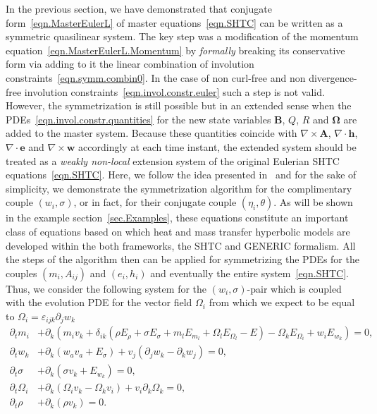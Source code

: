 \documentclass[twoside]{article}
\newcommand{\AAA}{{\boldsymbol{A}}}
\newcommand{\ww}{{\boldsymbol{w}}}
\newcommand{\ee}{{\boldsymbol{e}}}
\newcommand{\hh}{{\boldsymbol{h}}}
\newcommand{\BB}{{\boldsymbol{B}}}
\newcommand{\ted}{E} %
\newcommand{\pd}{\partial}
\begin{document}
In the previous section, we have demonstrated that conjugate 
form~\eqref{eqn.MasterEulerL} of master equations~\eqref{eqn.SHTC} can be 
written as a symmetric quasilinear system. The key 
step was a modification of the momentum 
equation~\eqref{eqn.MasterEulerL.Momentum} by \textit{formally} breaking its 
conservative 
form via adding to it the linear combination of involution 
constraints~\eqref{eqn.symm.combin0}. In the case of non curl-free and 
non divergence-free involution constraints~\eqref{eqn.invol.constr.euler} such 
a 
step is not valid. However, the symmetrization is still possible but in an 
extended sense when the PDEs~\eqref{eqn.invol.constr.quantities} for 
the new state variables $ \BB $, $ Q $, $ R $ and $ \bm{\Omega} $ are added to 
the 
master system. Because these quantities coincide with $ \nabla\times\AAA $, 
$ \nabla\cdot\hh $, $ \nabla\cdot\ee $ and $ \nabla\times\ww $ accordingly 
at each time instant, the extended system should be treated as a \textit{weakly 
non-local} extension system of the original Eulerian SHTC 
equations~\eqref{eqn.SHTC}. Here, we follow the idea presented 
in~\cite{Romenski2002} and for the sake of simplicity, we demonstrate the 
symmetrization 
algorithm 
for the 
complimentary couple $ (w_i,\sigma) $, or in fact, for their conjugate couple $ 
(\eta_i,\theta) $. As will be shown in 
the example section~\ref{sec.Examples}, these equations constitute an important 
class of equations based on which heat and mass transfer hyperbolic models are 
developed within the both frameworks, the SHTC and GENERIC formalism. All the 
steps of the algorithm then can be applied for 
symmetrizing the PDEs for the couples $ (m_i,A_{ij}) $ and $ (e_i,h_i) $ and 
eventually the entire system~\eqref{eqn.SHTC}.  Thus, we consider the 
following system for the $ 
(w_i,\sigma) $-pair which is coupled with the evolution PDE for the vector 
field $ \Omega_i $ from which we expect to be equal to $ \Omega_i = 
\varepsilon_{ijk}\pd_j w_k $
\begin{subequations}\label{eqn.symm.heat.E}
	\begin{align}
\pd_t m_i & + \pd _k \left (m_i v_k + \delta_{ik} \left( \rho \ted_\rho  + 
\sigma \ted_\sigma 	+ m_l\ted_{m_l} + \Omega_{l} \ted_{\Omega_l} - \ted 
\right) -  \Omega_{k} \ted_{\Omega_i} + w_i\ted_{w_k} \right ) = 0,\\[1mm]
\pd_t w_k & + \pd_k (w_a v_a + \ted_\sigma ) + v_j (\pd_j w_k - \pd_k w_j ) = 
0, \\[1mm]
\pd_t \sigma & +\pd _k(\sigma v_k + \ted_{w_k})=0,\\[1mm]
\pd_t \Omega_i & + \pd_k(\Omega_i v_k - \Omega_k v_i) + v_i \pd_k \Omega_k = 
0,\label{eqn.symm.heat.O}\\[1mm]
\pd_t \rho & +\pd_k (\rho v_k )=0.
	\end{align}
\end{subequations}
\end{document}
